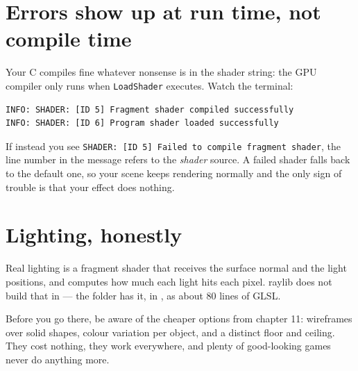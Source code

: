 \section{Errors show up at run time, not compile time}

Your C compiles fine whatever nonsense is in the shader string: the GPU compiler
only runs when \lstinline|LoadShader| executes. Watch the terminal:

\begin{lstlisting}[style=plain]
INFO: SHADER: [ID 5] Fragment shader compiled successfully
INFO: SHADER: [ID 6] Program shader loaded successfully
\end{lstlisting}

If instead you see \lstinline|SHADER: [ID 5] Failed to compile fragment shader|,
the line number in the message refers to the \emph{shader} source. A failed
shader falls back to the default one, so your scene keeps rendering normally and
the only sign of trouble is that your effect does nothing.

\section{Lighting, honestly}

Real lighting is a fragment shader that receives the surface normal and the light
positions, and computes how much each light hits each pixel. raylib does not
build that in --- the  folder has it, in
, as about 80 lines of GLSL.

Before you go there, be aware of the cheaper options from chapter 11: wireframes
over solid shapes, colour variation per object, and a distinct floor and ceiling.
They cost nothing, they work everywhere, and plenty of good-looking games never
do anything more.


